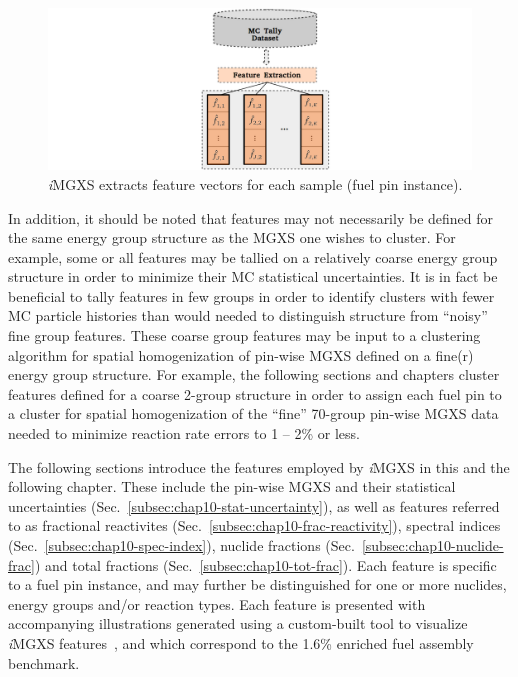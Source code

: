 \begin{figure}[h!]
\centering
\includegraphics[width=0.9\linewidth]{figures/unsupervised/features/engineering/extract}
\vspace{2mm}
\caption[\textit{i}MGXS sample feature extraction]{\textit{i}\ac{MGXS} extracts feature vectors for each sample (fuel pin instance).}
\label{fig:chap10-feature-extract}
\end{figure}

In addition, it should be noted that features may not necessarily be defined for the same energy group structure as the \ac{MGXS} one wishes to cluster. For example, some or all features may be tallied on a relatively coarse energy group structure in order to minimize their \ac{MC} statistical uncertainties. It is in fact be beneficial to tally features in few groups in order to identify clusters with fewer \ac{MC} particle histories than would needed to distinguish structure from ``noisy'' fine group features.
These coarse group features may be input to a clustering algorithm for spatial homogenization of pin-wise \ac{MGXS} defined on a fine(r) energy group structure. For example, the following sections and chapters cluster features defined for a coarse 2-group structure in order to assign each fuel pin to a cluster for spatial homogenization of the ``fine'' 70-group pin-wise \ac{MGXS} data needed to minimize reaction rate errors to 1 -- 2\% or less.

The following sections introduce the features employed by \textit{i}\ac{MGXS} in this and the following chapter. These include the pin-wise \ac{MGXS} and their statistical uncertainties (Sec.~\ref{subsec:chap10-stat-uncertainty}), as well as features referred to as fractional reactivites (Sec.~\ref{subsec:chap10-frac-reactivity}), spectral indices (Sec.~\ref{subsec:chap10-spec-index}), nuclide fractions (Sec.~\ref{subsec:chap10-nuclide-frac}) and total fractions (Sec.~\ref{subsec:chap10-tot-frac}). Each feature is specific to a fuel pin instance, and may further be distinguished for one or more nuclides, energy groups and/or reaction types. Each feature is presented with accompanying illustrations generated using a custom-built tool to visualize \textit{i}\ac{MGXS} features~\cite{abel2016bokeh}, and which correspond to the 1.6\% enriched fuel assembly benchmark.

